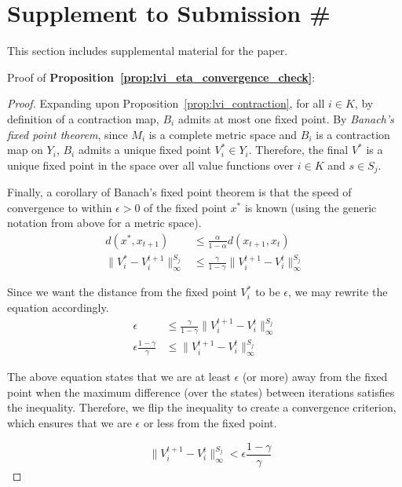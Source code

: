 \section*{Supplement to Submission \#}
\label{sec:supplement}

This section includes supplemental material for the paper.

Proof of {\bf Proposition~\ref{prop:lvi_eta_convergence_check}}:
\begin{proof}
Expanding upon Proposition~\ref{prop:lvi_contraction}, for all $i \in K$, by definition of a contraction map, $B_i$ admits at most one fixed point. By \emph{Banach's fixed point theorem}, since $M_i$ is a complete metric space and $B_i$ is a contraction map on $Y_i$, $B_i$ admits a unique fixed point $V_i^* \in Y_i$. Therefore, the final $V^*$ is a unique fixed point in the space over all value functions over $i \in K$ and $s \in S_j$.

Finally, a corollary of Banach's fixed point theorem is that the speed of convergence to within $\epsilon > 0$ of the fixed point $x^*$ is known (using the generic notation from above for a metric space).
\begin{align*}
    d(x^*, x_{t+1}) &\leq \frac{\alpha}{1 - \alpha} d(x_{t+1}, x_t) \\
    \| V_i^* - V_i^{t+1}\|_\infty^{S_j} &\leq \frac{\gamma}{1 - \gamma} \| V_i^{t+1} - V_i^t \|_\infty^{S_j}
\end{align*}

Since we want the distance from the fixed point $V_i^*$ to be $\epsilon$, we may rewrite the equation accordingly.
\begin{align*}
    \epsilon &\leq \frac{\gamma}{1 - \gamma} \| V_i^{t+1} - V_i^t \|_\infty^{S_j} \\
    \epsilon \frac{1 - \gamma}{\gamma} &\leq \| V_i^{t+1} - V_i^t \|_\infty^{S_j}
\end{align*}

The above equation states that we are at least $\epsilon$ (or more) away from the fixed point when the maximum difference (over the states) between iterations satisfies the inequality. Therefore, we flip the inequality to create a convergence criterion, which ensures that we are $\epsilon$ or less from the fixed point.

\begin{equation*}
    \quad \| V_i^{t+1} - V_i^t \|_\infty^{S_j} < \epsilon \frac{1 - \gamma}{\gamma}
\end{equation*}
\end{proof}


